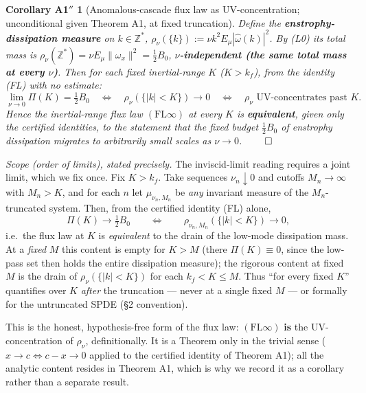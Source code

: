 \documentclass[11pt]{article}
\theoremstyle{remark}
\theoremstyle{plain}
\newtheorem*{corA1pp}{Corollary A1$''$}
\newcommand{\eqdef}{:=}
\begin{document}
\begin{corA1pp}[Anomalous-cascade flux law as UV-concentration; unconditional given Theorem A1, at fixed truncation]
Define the \textbf{enstrophy-dissipation measure} on $k \in \mathbb{Z}^*$,
$\rho_\nu(\{k\}) \eqdef \nu k^2 E_\mu|\hat\omega(k)|^2$. By (L0) its total mass is $\rho_\nu(\mathbb{Z}^*) = \nu E_\mu\|\omega_x\|^2
= \tfrac12 B_0$, \textbf{$\nu$-independent (the same total mass at every $\nu$)}. Then for each fixed inertial-range $K$
($K > k_f$), from the identity (FL) with no estimate:
\begin{equation}
   \lim_{\nu\to0} \Pi(K) = \tfrac12 B_0 \quad\iff\quad \rho_\nu(\{|k|<K\}) \to 0 \quad\iff\quad \rho_\nu \text{ UV-concentrates past } K.
\end{equation}
Hence the inertial-range flux law $(\mathrm{FL}\infty)$ at every $K$ is \textbf{equivalent}, given
only the certified identities, to the statement that the fixed budget $\tfrac12 B_0$ of
enstrophy dissipation migrates to arbitrarily small scales as $\nu\to0$. $\qed$
\end{corA1pp}

\emph{Scope (order of limits), stated precisely.} The inviscid-limit reading requires a
joint limit, which we fix once. Fix $K > k_f$. Take sequences $\nu_n \downarrow 0$ and cutoffs
$M_n \to \infty$ with $M_n > K$, and for each $n$ let $\mu_{\nu_n, M_n}$ be \emph{any} invariant
measure of the $M_n$-truncated system. Then, from the certified identity (FL) alone,
\begin{equation}
   \Pi(K) \longrightarrow \tfrac12 B_0
   \qquad\Longleftrightarrow\qquad
   \rho_{\nu_n, M_n}(\{|k|<K\}) \longrightarrow 0 ,
\end{equation}
i.e.\ the flux law at $K$ is \emph{equivalent} to the drain of the low-mode dissipation mass.
At a \emph{fixed} $M$ this content is empty for $K > M$ (there $\Pi(K)\equiv0$, since the low-pass
set then holds the entire dissipation measure); the rigorous content at fixed $M$ is the drain of
$\rho_\nu(\{|k|<K\})$ for each $k_f < K \le M$. Thus ``for every fixed $K$'' quantifies over $K$
\emph{after} the truncation --- never at a single fixed $M$ --- or formally for the untruncated
SPDE (\S2 convention).

This is the honest, hypothesis-free form of the flux law: $(\mathrm{FL}\infty)$ \textbf{is} the
UV-concentration of $\rho_\nu$, definitionally. It is a Theorem only in the trivial sense
($x\to c \iff c-x\to0$ applied to the certified identity of Theorem A1); all the analytic
content resides in Theorem A1, which is why we record it as a corollary rather than a
separate result.
\end{document}
